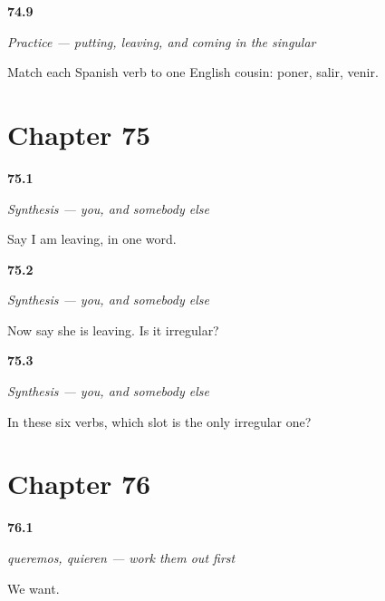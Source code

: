 \noindent\begin{minipage}[t]{\linewidth}
\raggedright
\hypertarget{review-ES-C13-practice-root-families}{\textbf{74.9}} \emph{Practice — putting, leaving, and coming in the singular}\par
\small Match each Spanish verb to one English cousin: poner, salir, venir.
\end{minipage}\par\medskip

\section*{Chapter 75}

\noindent\begin{minipage}[t]{\linewidth}
\raggedright
\hypertarget{review-ES-C13-sintesis-yo-go-me}{\textbf{75.1}} \emph{Synthesis — you, and somebody else}\par
\small Say I am leaving, in one word.
\end{minipage}\par\medskip

\noindent\begin{minipage}[t]{\linewidth}
\raggedright
\hypertarget{review-ES-C13-sintesis-yo-go-them}{\textbf{75.2}} \emph{Synthesis — you, and somebody else}\par
\small Now say she is leaving. Is it irregular?
\end{minipage}\par\medskip

\noindent\begin{minipage}[t]{\linewidth}
\raggedright
\hypertarget{review-ES-C13-sintesis-yo-go-which}{\textbf{75.3}} \emph{Synthesis — you, and somebody else}\par
\small In these six verbs, which slot is the only irregular one?
\end{minipage}\par\medskip

\section*{Chapter 76}

\noindent\begin{minipage}[t]{\linewidth}
\raggedright
\hypertarget{review-ES-C13-plurales-cambio-want}{\textbf{76.1}} \emph{queremos, quieren — work them out first}\par
\small We want.
\end{minipage}\par\medskip

